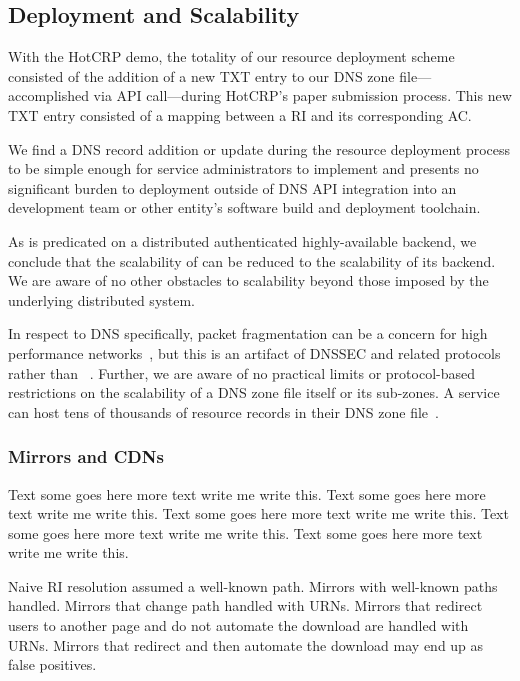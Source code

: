 \subsection{Deployment and Scalability}

With the HotCRP demo, the totality of our resource deployment scheme consisted
of the addition of a new TXT entry to our DNS zone file---accomplished via API
call---during HotCRP's paper submission process. This new TXT entry consisted of
a mapping between a RI and its corresponding AC.

We find a DNS record addition or update during the resource deployment process
to be simple enough for service administrators to implement and presents no
significant burden to deployment outside of DNS API integration into an
development team or other entity's software build and deployment toolchain.

As \SYSTEM{} is predicated on a distributed authenticated highly-available
backend, we conclude that the scalability of \SYSTEM{} can be reduced to the
scalability of its backend. We are aware of no other obstacles to scalability
beyond those imposed by the underlying distributed system.

In respect to DNS specifically, packet fragmentation can be a concern for high
performance networks~\cite{EDNS}, but this is an artifact of DNSSEC and related
protocols rather than \SYSTEM{}~\cite{DNSSEC}. Further, we are aware of no
practical limits or protocol-based restrictions on the scalability of a DNS zone
file itself or its sub-zones. A service can host tens of thousands of resource
records in their DNS zone file~\cite{DNS1, DNS2}.

\subsubsection{Mirrors and CDNs}

Text some goes here more text write me write this. Text some goes here more text
write me write this. Text some goes here more text write me write this. Text
some goes here more text write me write this. Text some goes here more text
write me write this.

Naive RI resolution assumed a well-known path. Mirrors with well-known paths
handled. Mirrors that change path handled with URNs. Mirrors that redirect users
to another page and do not automate the download are handled with URNs. Mirrors
that redirect and then automate the download may end up as false positives.

